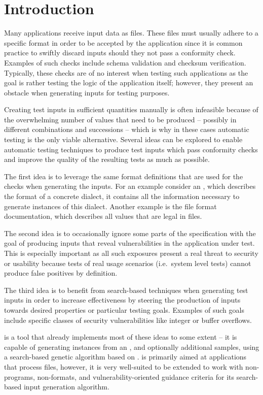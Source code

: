 \section{Introduction}
Many applications receive input data as files. These files must usually adhere to a specific format in order
to be accepted by the application since it is common practice to swiftly discard inputs should they not pass a
conformity check. Examples of such checks include schema validation and checksum verification. Typically, these
checks are of no interest when testing such applications as the goal is rather testing the logic of the
application itself; however, they present an obstacle when generating inputs for
testing purposes.

Creating test inputs in sufficient quantities manually is often infeasible because of the overwhelming number
of values that need to be produced -- possibly in different combinations and successions -- which is why in
these cases automatic testing is the only viable alternative. Several ideas can be explored to enable automatic
testing techniques to produce test inputs which pass conformity checks and improve the quality of the
resulting tests as much as possible.

The first idea is to leverage the same format definitions that are used for the checks when generating the
inputs. For an example consider an \xsd, which describes the format of a concrete \xml dialect, it contains all
the information necessary to generate instances of this dialect. Another example is the \png file format
documentation, which describes all values that are legal in \png files.

The second idea is to occasionally ignore some parts of the specification with the goal of producing inputs
that reveal vulnerabilities in the application under test. This is especially important as all such exposures
present a real threat to security or usability because tests of real usage scenarios (i.e.\ system level tests)
cannot produce false positives by definition.

The third idea is to benefit from search-based techniques when generating test inputs in order to increase
effectiveness by steering the production of inputs towards desired properties or particular testing goals.
Examples of such goals include specific classes of security vulnerabilities like integer or buffer overflows.

\xmlmate{}\cite{Havrikov:2014:XEX:2635868.2661666} is a tool that already implements most of these ideas to
some extent -- it is capable of generating \xml instances from an \xsd{}, and optionally additional \xml
samples, using a search-based genetic algorithm based on \evosuite{}\cite{fraser2013whole}. \xmlmate is
primarily aimed at \java applications that process \xml files, however, it is very well-suited to be extended
to work with non-\java programs, non-\xml formats, and vulnerability-oriented guidance criteria for its
search-based input generation algorithm.

